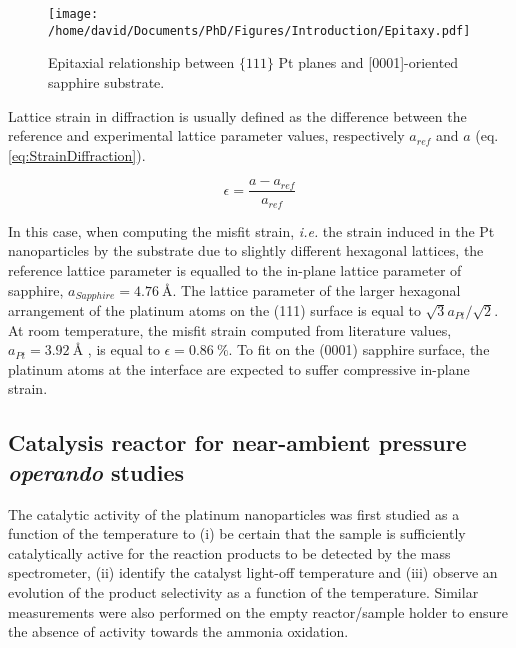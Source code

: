 \begin{figure}
    \centering
    \texttt{[image: /home/david/Documents/PhD/Figures/Introduction/Epitaxy.pdf]}
    \caption{
        Epitaxial relationship between $\{111\}$ Pt planes and [0001]-oriented sapphire substrate.
    }
    \label{fig:Epitaxy}
\end{figure}%

Lattice strain in diffraction is usually defined as the difference between the reference and experimental lattice parameter values, respectively $a_{ref}$ and $a$ (eq. \ref{eq:StrainDiffraction}).

\begin{equation}
    \epsilon = \frac{a - a_{ref}}{a_{ref}}
    \label{eq:StrainDiffraction}
\end{equation}

In this case, when computing the misfit strain, \textit{i.e.} the strain induced in the Pt nanoparticles by the substrate due to slightly different hexagonal lattices, the reference lattice parameter is equalled to the in-plane lattice parameter of sapphire, $a_{Sapphire} = \qty{4.76}{\angstrom}$.
The lattice parameter of the larger hexagonal arrangement of the platinum atoms on the (111) surface is equal to $\sqrt{3} a_{Pt} / \sqrt{2}$.
At room temperature, the misfit strain computed from literature values, $a_{Pt} = \qty{3.92}{\angstrom}$ \parencite{Waseda1975}, is equal to $\epsilon = \qty{0.86}{\percent}$.
To fit on the (0001) sapphire surface, the platinum atoms at the interface are expected to suffer compressive in-plane strain.

\subsection{Catalysis reactor for near-ambient pressure \textit{operando} studies}

The catalytic activity of the platinum nanoparticles was first studied as a function of the temperature to (i) be certain that the sample is sufficiently catalytically active for the reaction products to be detected by the mass spectrometer, (ii) identify the catalyst light-off temperature and (iii) observe an evolution of the product selectivity as a function of the temperature.
Similar measurements were also performed on the empty reactor/sample holder to ensure the absence of activity towards the ammonia oxidation.

